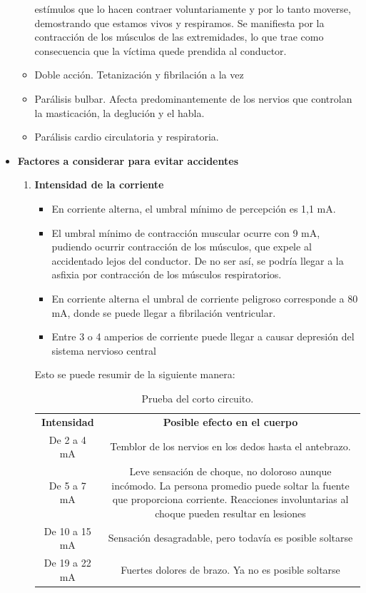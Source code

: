 \documentclass[12pt,letterpaper]{report}
\begin{document}
\begin{itemize}
\begin{itemize}
estímulos que lo hacen contraer voluntariamente y por lo tanto moverse,
demostrando que estamos vivos y respiramos. Se manifiesta por la
contracción de los músculos de las extremidades, lo que trae como
consecuencia que la víctima quede prendida al conductor.
\item Doble acción. Tetanización y fibrilación a la vez
\item Parálisis bulbar. Afecta predominantemente de los nervios que controlan la
masticación, la deglución y el habla.
\item Parálisis cardio circulatoria y respiratoria.
\end{itemize}
\item \textbf{Factores a considerar para evitar accidentes}
\begin{enumerate}
\item \textbf{Intensidad de la corriente}
\begin{itemize}
\item En corriente alterna, el umbral mínimo de percepción es 1,1 mA.
\item El umbral mínimo de contracción muscular ocurre con 9 mA,
pudiendo ocurrir contracción de los músculos, que expele al
accidentado lejos del conductor. De no ser así, se podría llegar a la
asfixia por contracción de los músculos respiratorios.
\item En corriente alterna el umbral de corriente peligroso corresponde a
80 mA, donde se puede llegar a fibrilación ventricular.
\item Entre 3 o 4 amperios de corriente puede llegar a causar depresión
del sistema nervioso central
\end{itemize}
Esto se puede resumir de la siguiente manera:
\begin{table}[H]
	\caption{Prueba del corto circuito.}
	\label{tab:ACT1}
	\centering
	\begin{tabularx}{12cm}{CC}
		\textbf{Intensidad} & \textbf{Posible efecto en el cuerpo} \\
		De 2 a 4 mA & Temblor de los nervios en los dedos hasta el antebrazo. \\
		De 5 a 7 mA & Leve sensación de choque, no doloroso aunque incómodo.
		La persona promedio puede soltar la fuente que proporciona
		corriente. Reacciones involuntarias al choque pueden
		resultar en lesiones \\
		De 10 a 15 mA & Sensación desagradable, pero todavía es posible soltarse \\
		De 19 a 22 mA & Fuertes dolores de brazo. Ya no es posible soltarse

\end{tabularx}
\end{table}
\end{enumerate}
\end{itemize}
\end{document}
